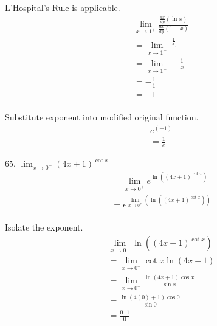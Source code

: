 \documentclass{article}
\begin{document}
\begin{description}
\begin{description}
                L'Hospital's Rule is applicable.
                \begin{align*}
                   & \lim_{x\to1^+}\frac{\frac{dx}{dy}(\ln{x})}{\frac{dx}{dy}(1-x)} \\[1em]
                   & =   \lim_{x\to1^+}\frac{\frac{1}{x}}{-1}                       \\[1em]
                   & =   \lim_{x\to1^+} - \frac{1}{x}                               \\[1em]
                   & =    - \frac{1}{1}                                             \\[1em]
                   & =    - 1                                                       \\[1em]
                \end{align*}

                Substitute exponent into modified original function.
                \begin{align*}
                   & e^{(-1)}               \\[1em]
                   & =  \boxed{\frac{1}{e}}
                \end{align*}
          \item 65. $\lim_{x\to0^+}(4x + 1)^{\cot{x}}$
                \begin{align*}
                   & = \lim_{x\to0^+}e^{\ln{((4x + 1)^{\cot{x}})}}   \\[1em]
                   & = e^{\lim_{x\to0^+}(\ln{((4x + 1)^{\cot{x}})})} \\[1em]
                \end{align*}

                Isolate the exponent.
                \begin{align*}
                   & \lim_{x\to0^+}\ln{((4x + 1)^{\cot{x}})}              \\[1em]
                   & = \lim_{x\to0^+}\cot{x}\ln{(4x + 1)}                 \\[1em]
                   & = \lim_{x\to0^+}\frac{\ln{(4x + 1)\cos{x}}}{\sin{x}} \\[1em]
                   & = \frac{\ln{(4(0) + 1)\cos{0}}}{\sin{0}}             \\[1em]
                   & = \frac{0 \cdot 1}{0}
                \end{align*}


\end{description}
\end{description}
\end{document}
